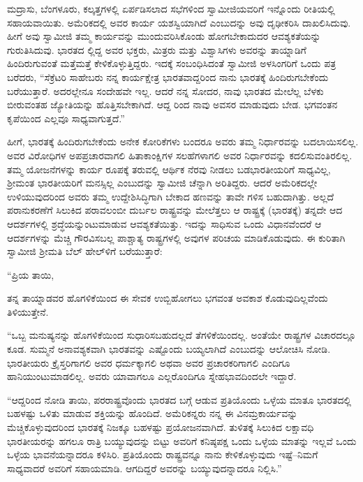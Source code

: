 ಮದ್ರಾಸು, ಬೆಂಗಳೂರು, ಕಲ್ಕತ್ತಗಳಲ್ಲಿ ಏರ್ಪಡಿಸಲಾದ ಸಭೆಗಳಿಂದ ಸ್ವಾಮೀಜಿಯವರಿಗೆ ಇನ್ನೊಂದು ರೀತಿಯಲ್ಲಿ ಸಹಾಯವಾಯಿತು. ಅಮೆರಿಕದಲ್ಲಿ ಅವರ ಕಾರ್ಯ ಯಶಸ್ವಿಯಾಗಿದೆ ಎಂಬುದನ್ನು ಅವು ದೃಢೀಕರಿಸಿ ದಾಖಲಿಸಿದುವು. ಹೀಗೆ ಅವು ಸ್ವಾಮೀಜಿ ತಮ್ಮ ಕಾರ್ಯವನ್ನು ಮುಂದುವರಿಸಿಕೊಂಡು ಹೋಗಬೇಕಾದುದರ ಆವಶ್ಯಕತೆಯನ್ನು ಗುರುತಿಸಿದುವು. ಭಾರತದ ಲ್ಲಿದ್ದ ಅವರ ಭಕ್ತರು, ಮಿತ್ರರು ಮತ್ತು ವಿಶ್ವಾಸಿಗಳು ಅವರನ್ನು ತಾಯ್ನಾಡಿಗೆ ಹಿಂದಿರುಗುವಂತೆ ಮತ್ತೆಮತ್ತೆ ಕೇಳಿಕೊಳ್ಳುತ್ತಿದ್ದರು. ಇದಕ್ಕೆ ಸಂಬಂಧಿಸಿದಂತೆ ಸ್ವಾಮೀಜಿ ಅಳಸಿಂಗರಿಗೆ ಒಂದು ಪತ್ರ ಬರೆದರು, “ಸೆಕ್ರೆಟರಿ ಸಾಹೇಬರು ನನ್ನ ಕಾರ್ಯಕ್ಷೇತ್ರ ಭಾರತವಾದ್ದರಿಂದ ನಾನು ಭಾರತಕ್ಕೆ ಹಿಂದಿರುಗಬೇಕೆಂದು ಬರೆಯುತ್ತಾರೆ. ಅದರಲ್ಲೇನೂ ಸಂದೇಹವೇ ಇಲ್ಲ. ಆದರೆ ನನ್ನ ಸೋದರ, ನಾವು ಭಾರತದ ಮೇಲೆಲ್ಲ ಬೆಳಕು ಬೀರುವಂತಹ ಜ್ಯೋತಿಯನ್ನು ಹೊತ್ತಿಸಬೇಕಾಗಿದೆ. ಆದ್ದ ರಿಂದ ನಾವು ಅವಸರ ಮಾಡುವುದು ಬೇಡ. ಭಗವಂತನ ಕೃಪೆಯಿಂದ ಎಲ್ಲವೂ ಸಾಧ್ಯವಾಗುತ್ತದೆ.”

ಹೀಗೆ, ಭಾರತಕ್ಕೆ ಹಿಂದಿರುಗಬೇಕೆಂದು ಅನೇಕ ಕೋರಿಕೆಗಳು ಬಂದರೂ ಅವರು ತಮ್ಮ ನಿರ್ಧಾರವನ್ನು ಬದಲಾಯಿಸಲಿಲ್ಲ. ಅವರ ವಿರೋಧಿಗಳ ಅಪಪ್ರಚಾರವಾಗಲಿ ಹಿತಾಕಾಂಕ್ಷಿಗಳ ಸಲಹೆಗಳಾಗಲಿ ಅವರ ನಿರ್ಧಾರವನ್ನು ಕದಲಿಸುವಂತಿರಲಿಲ್ಲ. ತಮ್ಮ ಯೋಜನೆಗಳನ್ನು ಕಾರ್ಯ ರೂಪಕ್ಕೆ ತರುವಲ್ಲಿ ಆರ್ಥಿಕ ನೆರವು ನೀಡಲು ಬಡಭಾರತೀಯರಿಗೆ ಸಾಧ್ಯವಿಲ್ಲ, ಶ್ರೀಮಂತ ಭಾರತೀಯರಿಗೆ ಮನಸ್ಸಿಲ್ಲ ಎಂಬುದನ್ನು ಸ್ವಾಮೀಜಿ ಚೆನ್ನಾಗಿ ಅರಿತಿದ್ದರು. ಆದರೆ ಅಮೆರಿಕದಲ್ಲೇ ಉಳಿಯುವುದರಿಂದ ಅವರು ತಮ್ಮ ಉದ್ದೇಶಿಸಿದ್ಧಿಗಾಗಿ ಬೇಕಾದ ಹಣವನ್ನು ತಾವೇ ಗಳಿಸ ಬಹುದಾಗಿತ್ತು. ಅಲ್ಲದೆ ಪರಾನುಕರಣೆಗೆ ಸಿಲುಕಿದ ಪರಾವಲಂಬೀ ದುರ್ಬಲ ರಾಷ್ಟ್ರವನ್ನು ಮೇಲೆತ್ತಲು ಆ ರಾಷ್ಟ್ರಕ್ಕೆ (ಭಾರತಕ್ಕೆ) ತನ್ನದೇ ಆದ ಆದರ್ಶಗಳಲ್ಲಿ ಶ್ರದ್ಧೆಯನ್ನುಂಟುಮಾಡುವ ಆವಶ್ಯಕತೆಯಿತ್ತು. ಇದನ್ನು ಸಾಧಿಸುವ ಒಂದು ವಿಧಾನವೆಂದರೆ ಆ ಆದರ್ಶಗಳನ್ನು ಮೆಚ್ಚಿ ಗೌರವಿಸಬಲ್ಲ ಪಾಶ್ಚಾತ್ಯ ರಾಷ್ಟ್ರಗಳಲ್ಲಿ ಅವುಗಳ ಪರಿಚಯ ಮಾಡಿಕೊಡುವುದು. ಈ ಕುರಿತಾಗಿ ಸ್ವಾಮೀಜಿ ಶ್ರೀಮತಿ ಬೆಲ್ ಹೇಲ್​ಳಿಗೆ ಬರೆಯುತ್ತಾರೆ:

“ಪ್ರಿಯ ತಾಯಿ,

ತನ್ನ ತಾಯ್ನಾಡವರ ಹೊಗಳಿಕೆಯಿಂದ ಈ ಸೇವಕ ಉಬ್ಬಿಹೋಗಲು ಭಗವಂತ ಅವಕಾಶ ಕೊಡುವುದಿಲ್ಲವೆಂದು ತಿಳಿಯುತ್ತೇನೆ.

“ಒಬ್ಬ ಮನುಷ್ಯನನ್ನು ಹೊಗಳಿಕೆಯಿಂದ ಸುಧಾರಿಸಬಹುದಲ್ಲದೆ ತೆಗಳಿಕೆಯಿಂದಲ್ಲ. ಅಂತೆಯೇ ರಾಷ್ಟ್ರಗಳ ವಿಚಾರದಲ್ಲೂ ಕೂಡ. ಸುಮ್ಮನೆ ಅನಾವಶ್ಯಕವಾಗಿ ಭಾರತವನ್ನು ಎಷ್ಟೊಂದು ಬಯ್ಯಲಾಗಿದೆ ಎಂಬುದನ್ನು ಆಲೋಚಿಸಿ ನೋಡಿ. ಭಾರತೀಯರು ಕ್ರೈಸ್ತರಿಗಾಗಲಿ ಅವರ ಧರ್ಮಕ್ಕಾಗಲಿ ಅಥವಾ ಅವರ ಪ್ರಚಾರಕರಿಗಾಗಲಿ ಎಂದಿಗೂ ಹಾನಿಯುಂಟುಮಾಡಲಿಲ್ಲ. ಅವರು ಯಾವಾಗಲೂ ಎಲ್ಲರೊಂದಿಗೂ ಸ್ನೇಹಭಾವದಿಂದಲೇ ಇದ್ದಾರೆ.

“ಆದ್ದರಿಂದ ನೋಡಿ ತಾಯಿ, ಪರರಾಷ್ಟ್ರವೊಂದು ಭಾರತದ ಬಗ್ಗೆ ಆಡುವ ಪ್ರತಿಯೊಂದು ಒಳ್ಳೆಯ ಮಾತೂ ಭಾರತದಲ್ಲಿ ಬಹಳಷ್ಟು ಒಳಿತು ಮಾಡುವ ಶಕ್ತಿಯನ್ನು ಹೊಂದಿದೆ. ಅಮೆರಿಕನ್ನರು ನನ್ನ ಈ ವಿನಮ್ರಕಾರ್ಯವನ್ನು ಮೆಚ್ಚಿಕೊಳ್ಳುವುದರಿಂದ ಭಾರತಕ್ಕೆ ನಿಜಕ್ಕೂ ಬಹಳಷ್ಟು ಪ್ರಯೋಜನವಾಗಿದೆ. ತುಳಿತಕ್ಕೆ ಸಿಲುಕಿದ ಲಕ್ಷಾವಧಿ ಭಾರತೀಯರನ್ನು ಹಗಲೂ ರಾತ್ರಿ ಬಯ್ಯುವುದನ್ನು ಬಿಟ್ಟು ಅವರಿಗೆ ಕನಿಷ್ಠಪಕ್ಷ ಒಂದು ಒಳ್ಳೆಯ ಮಾತನ್ನು ಇಲ್ಲವೆ ಒಂದು ಒಳ್ಳೆಯ ಭಾವನೆಯನ್ನಾದರೂ ಕಳಿಸಿರಿ. ಪ್ರತಿಯೊಂದು ರಾಷ್ಟ್ರವನ್ನೂ ನಾನು ಕೇಳಿಕೊಳ್ಳುವುದು ಇಷ್ಟೆ–ನಿಮಗೆ ಸಾಧ್ಯವಾದರೆ ಅವರಿಗೆ ಸಹಾಯಮಾಡಿ. ಆಗದಿದ್ದರೆ ಅವರನ್ನು ಬಯ್ಯುವುದನ್ನಾದರೂ ನಿಲ್ಲಿಸಿ.”

